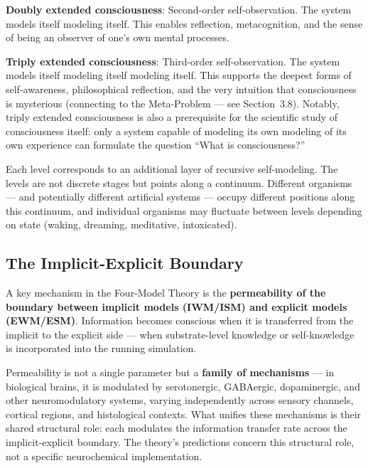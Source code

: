 \documentclass[12pt]{article}
\begin{document}
\textbf{Doubly extended consciousness}: Second-order self-observation. The system models itself modeling itself. This enables reflection, metacognition, and the sense of being an observer of one's own mental processes.

\textbf{Triply extended consciousness}: Third-order self-observation. The system models itself modeling itself modeling itself. This supports the deepest forms of self-awareness, philosophical reflection, and the very intuition that consciousness is mysterious (connecting to the Meta-Problem --- see Section~3.8). Notably, triply extended consciousness is also a prerequisite for the scientific study of consciousness itself: only a system capable of modeling its own modeling of its own experience can formulate the question ``What is consciousness?''

Each level corresponds to an additional layer of recursive self-modeling. The levels are not discrete stages but points along a continuum. Different organisms --- and potentially different artificial systems --- occupy different positions along this continuum, and individual organisms may fluctuate between levels depending on state (waking, dreaming, meditative, intoxicated).


\subsection{The Implicit-Explicit Boundary}


A key mechanism in the Four-Model Theory is the \textbf{permeability of the boundary between implicit models (IWM/ISM) and explicit models (EWM/ESM)}. Information becomes conscious when it is transferred from the implicit to the explicit side --- when substrate-level knowledge or self-knowledge is incorporated into the running simulation.

Permeability is not a single parameter but a \textbf{family of mechanisms} --- in biological brains, it is modulated by serotonergic, GABAergic, dopaminergic, and other neuromodulatory systems, varying independently across sensory channels, cortical regions, and histological contexts. What unifies these mechanisms is their shared structural role: each modulates the information transfer rate across the implicit-explicit boundary. The theory's predictions concern this structural role, not a specific neurochemical implementation.
\end{document}
